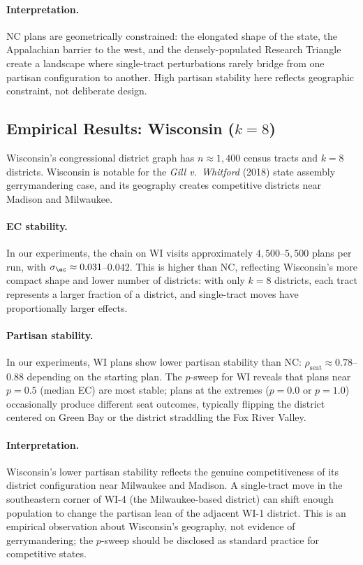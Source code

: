 \paragraph{Interpretation.}
NC plans are geometrically constrained: the elongated shape of the state,
the Appalachian barrier to the west, and the densely-populated Research
Triangle create a landscape where single-tract perturbations rarely bridge
from one partisan configuration to another.
High partisan stability here reflects geographic constraint, not deliberate
design.

\subsection{Empirical Results: Wisconsin ($k = 8$)}

Wisconsin's congressional district graph has $n \approx 1{,}400$ census
tracts and $k = 8$ districts.
Wisconsin is notable for the \textit{Gill v.\ Whitford} (2018) state
assembly gerrymandering case, and its geography creates competitive
districts near Madison and Milwaukee.

\paragraph{EC stability.}
In our experiments, the \flip{} chain on WI visits approximately
$4{,}500$--$5{,}500$ plans per run, with $\sigma_{\ec} \approx 0.031$--$0.042$.
This is higher than NC, reflecting Wisconsin's more compact shape and lower
number of districts: with only $k = 8$ districts, each tract represents a
larger fraction of a district, and single-tract moves have proportionally
larger effects.

\paragraph{Partisan stability.}
In our experiments, WI plans show lower partisan stability than NC:
$\rho_{\mathrm{seat}} \approx 0.78$--$0.88$ depending on the starting plan.
The $p$-sweep for WI reveals that plans near $p = 0.5$ (median EC) are most
stable; plans at the extremes ($p = 0.0$ or $p = 1.0$) occasionally produce
different seat outcomes, typically flipping the district centered on Green Bay
or the district straddling the Fox River Valley.

\paragraph{Interpretation.}
Wisconsin's lower partisan stability reflects the genuine competitiveness of
its district configuration near Milwaukee and Madison.
A single-tract move in the southeastern corner of WI-4 (the Milwaukee-based
district) can shift enough population to change the partisan lean of the
adjacent WI-1 district.
This is an empirical observation about Wisconsin's geography, not evidence of
gerrymandering; the $p$-sweep should be disclosed as standard practice for
competitive states.

